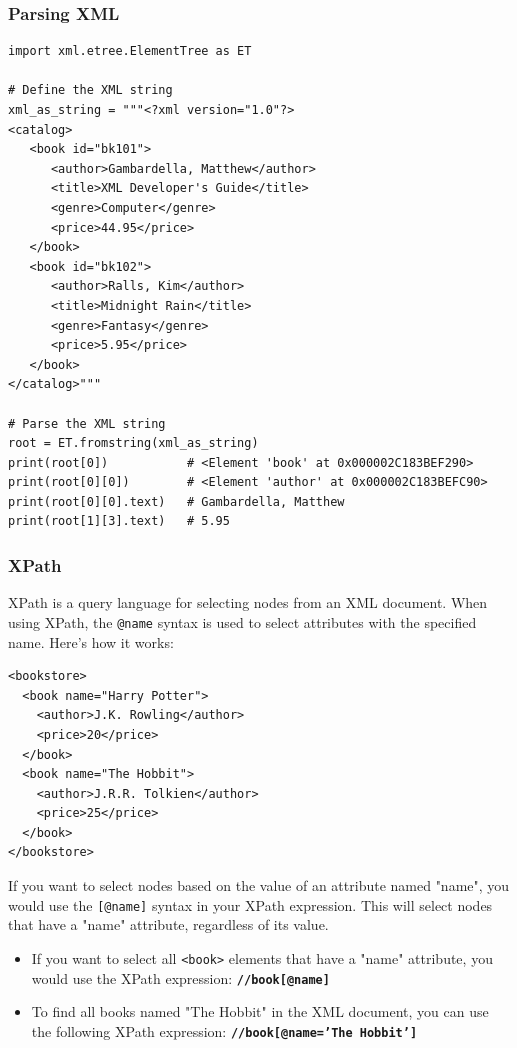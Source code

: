 \subsubsection{Parsing XML}
\begin{codebox}
\begin{verbatim}
import xml.etree.ElementTree as ET

# Define the XML string
xml_as_string = """<?xml version="1.0"?>
<catalog>
   <book id="bk101">
      <author>Gambardella, Matthew</author>
      <title>XML Developer's Guide</title>
      <genre>Computer</genre>
      <price>44.95</price>
   </book>
   <book id="bk102">
      <author>Ralls, Kim</author>
      <title>Midnight Rain</title>
      <genre>Fantasy</genre>
      <price>5.95</price>
   </book>
</catalog>"""

# Parse the XML string
root = ET.fromstring(xml_as_string)
print(root[0])           # <Element 'book' at 0x000002C183BEF290>
print(root[0][0])        # <Element 'author' at 0x000002C183BEFC90>
print(root[0][0].text)   # Gambardella, Matthew
print(root[1][3].text)   # 5.95
\end{verbatim}
\end{codebox}

\subsubsection{XPath}
XPath is a query language for selecting nodes from an XML document. When using XPath, the \texttt{@name} syntax is used to select attributes with the specified name. Here's how it works:
\begin{codebox}
\begin{verbatim}
<bookstore>
  <book name="Harry Potter">
    <author>J.K. Rowling</author>
    <price>20</price>
  </book>
  <book name="The Hobbit">
    <author>J.R.R. Tolkien</author>
    <price>25</price>
  </book>
</bookstore>
\end{verbatim}
\end{codebox}
If you want to select nodes based on the value of an attribute named "name", you would use the \texttt{[@name]} syntax in your XPath expression. This will select nodes that have a "name" attribute, regardless of its value. 
\begin{itemize}
\item If you want to select all \texttt{<book>} elements that have a "name" attribute, you would use the XPath expression: \textbf{\texttt{//book[@name]}}
\item To find all books named "The Hobbit" in the XML document, you can use the following XPath expression: \textbf{\texttt{//book[@name='The Hobbit']}}
\end{itemize}

